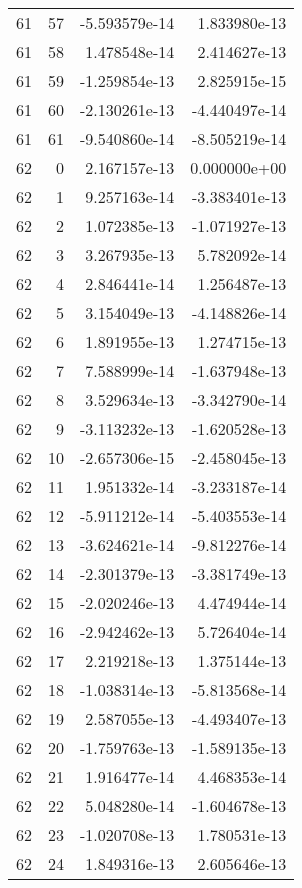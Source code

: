 \begin{tabular}{rrrr}
  61 &   57 & -5.593579e-14 &  1.833980e-13 \\
  61 &   58 &  1.478548e-14 &  2.414627e-13 \\
  61 &   59 & -1.259854e-13 &  2.825915e-15 \\
  61 &   60 & -2.130261e-13 & -4.440497e-14 \\
  61 &   61 & -9.540860e-14 & -8.505219e-14 \\
  62 &    0 &  2.167157e-13 &  0.000000e+00 \\
  62 &    1 &  9.257163e-14 & -3.383401e-13 \\
  62 &    2 &  1.072385e-13 & -1.071927e-13 \\
  62 &    3 &  3.267935e-13 &  5.782092e-14 \\
  62 &    4 &  2.846441e-14 &  1.256487e-13 \\
  62 &    5 &  3.154049e-13 & -4.148826e-14 \\
  62 &    6 &  1.891955e-13 &  1.274715e-13 \\
  62 &    7 &  7.588999e-14 & -1.637948e-13 \\
  62 &    8 &  3.529634e-13 & -3.342790e-14 \\
  62 &    9 & -3.113232e-13 & -1.620528e-13 \\
  62 &   10 & -2.657306e-15 & -2.458045e-13 \\
  62 &   11 &  1.951332e-14 & -3.233187e-14 \\
  62 &   12 & -5.911212e-14 & -5.403553e-14 \\
  62 &   13 & -3.624621e-14 & -9.812276e-14 \\
  62 &   14 & -2.301379e-13 & -3.381749e-13 \\
  62 &   15 & -2.020246e-13 &  4.474944e-14 \\
  62 &   16 & -2.942462e-13 &  5.726404e-14 \\
  62 &   17 &  2.219218e-13 &  1.375144e-13 \\
  62 &   18 & -1.038314e-13 & -5.813568e-14 \\
  62 &   19 &  2.587055e-13 & -4.493407e-13 \\
  62 &   20 & -1.759763e-13 & -1.589135e-13 \\
  62 &   21 &  1.916477e-14 &  4.468353e-14 \\
  62 &   22 &  5.048280e-14 & -1.604678e-13 \\
  62 &   23 & -1.020708e-13 &  1.780531e-13 \\
  62 &   24 &  1.849316e-13 &  2.605646e-13 \\

\end{tabular}
